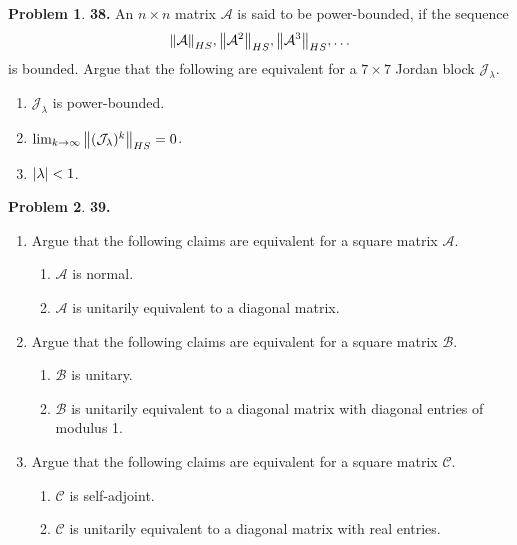 \documentclass{article}
\theoremstyle{definition}
\newtheorem*{prob*}{Problem}
\newcommand{\A}{\mathcal{A}}
\newcommand{\B}{\mathcal{B}}
\newcommand{\jor}{\mathcal{J}}
\begin{document}
\newpage




\begin{prob*}\textbf{38.} An $n\times n$ matrix $\A$ is said to be power-bounded, if the sequence
	\begin{align*}
	\norm{\A}_{HS}, \norm{\A^2}_{HS}, \norm{\A^3}_{HS}, \dots
	\end{align*}
	is bounded. Argue that the following are equivalent for a $7\times 7$ Jordan block $\jor_\lambda$.
	\begin{enumerate}
		\item $\jor_\lambda$ is power-bounded. 
		\item $\lim_{k\to\infty} \norm{(\jor_\lambda)^k}_{HS}= 0$.
		\item $\abs{\lambda} < 1$.
	\end{enumerate}
	
\end{prob*}





\newpage



\begin{prob*}\textbf{39.} 
	\begin{enumerate}
		\item Argue that the following claims are equivalent for a square matrix $\A$.
		
		\begin{enumerate}
			\item $\A$ is normal.
			\item $\A$ is unitarily equivalent to a diagonal matrix.
		\end{enumerate}
		
		
		
		\item Argue that the following claims are equivalent for a square matrix $\B$.
		
		\begin{enumerate}
			\item $\B$ is unitary.
			\item $\B$ is unitarily equivalent to a diagonal matrix with diagonal entries of modulus 1. 
		\end{enumerate}
		
		
		\item Argue that the following claims are equivalent for a square matrix $\mathcal{C}$.
		
		\begin{enumerate}
			\item $\mathcal{C}$ is self-adjoint.
			\item $\mathcal{C}$ is unitarily equivalent to a diagonal matrix with real entries.
		\end{enumerate}
	\end{enumerate}
	
\end{prob*}
\end{document}
